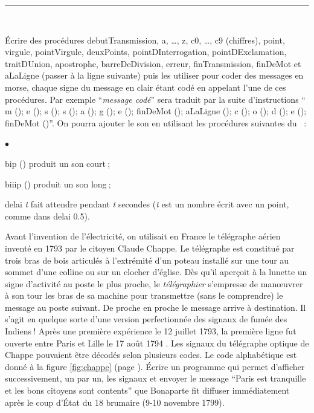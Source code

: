 \noindent \rule{137mm}{0.1mm} %
\begin{exercices}{\ \\
\vspace{-\baselineskip}

\sloppy
\tiret  Écrire des procédures {\idt debutTransmission}, {\idt a}, \ldots, {\idt z}, {\idt c0},
\ldots, {\idt c9} (chiffres), {\idt point}, {\idt virgule},
 {\idt pointVirgule}, {\idt deuxPoints}, {\idt pointDInterrogation},
 {\idt pointDExclamation}, {\idt traitDUnion}, {\idt apostrophe},
  {\idt barreDeDivision},
 {\idt erreur}, {\idt finTransmission}, {\idt finDeMot} et
 {\idt aLaLigne} (passer à la ligne suivante) puis les utiliser pour coder
 des messages en morse, chaque signe du message en clair étant codé en appelant l'une
 de ces procédures. Par exemple ``{\em message codé}'' sera traduit par la suite d'instructions
`` {\ttfamily\idt m (); e (); s (); s (); a (); g (); e (); finDeMot (); aLaLigne ();
 c (); o (); d (); e (); finDeMot ()}''. On pourra ajouter le son en utilisant les procédures suivantes
 du \robot~:
 \begin{list}{$\scriptscriptstyle\bullet$}{
}
   \item {\idt bip ()} produit un son court$\:$;
   \item {\idt biiip ()} produit un son long$\:$;
   \item {\idt delai {\rm\em t}} fait attendre pendant {\em t} secondes ({\em t} est un nombre écrit avec un point, comme dans {\idt delai 0.5}).
 \end{list}
 
 \tiret Avant l'invention de l'électricité, on utilisait en France le télégraphe  aérien inventé en
 1793 par le citoyen Claude Chappe. Le télégraphe est constitué par trois bras de bois articulés
 à l'extrémité d'un poteau ins\-tal\-lé sur une tour au sommet d'une colline ou sur un clocher d'église.
 Dès qu'il aperçoit à la lunette un signe d'activité au poste le plus proche, le {\em télégraphier}
 s'empresse de manœuvrer à son tour les bras de sa machine pour transmettre (sans le comprendre)
  le message au poste suivant. De proche en proche le message arrive à destination. Il s'agit en
  quelque sorte d'une version perfectionnée des signaux de fumée des Indiens$\:$! Après une première
  expérience le 12 juillet 1793, la première ligne fut ouverte entre Paris et Lille le 17 août 1794
  \cite{bertho}. Les signaux du télégraphe optique de Chappe pouvaient être décodés
  selon plusieurs codes. Le code alphabétique est donné à la figure \ref{fig:chappe} (page
  \pageref{fig:chappe}). Écrire un programme qui permet d'afficher successivement, un par un, les
  signaux et envoyer le message ``Paris est tranquille et les bons citoyens sont contents''
  que Bonaparte fit diffuser immédiatement après le coup d'État du 18 brumaire (9-10 novembre 
  1799).
  
}
\end{exercices}
